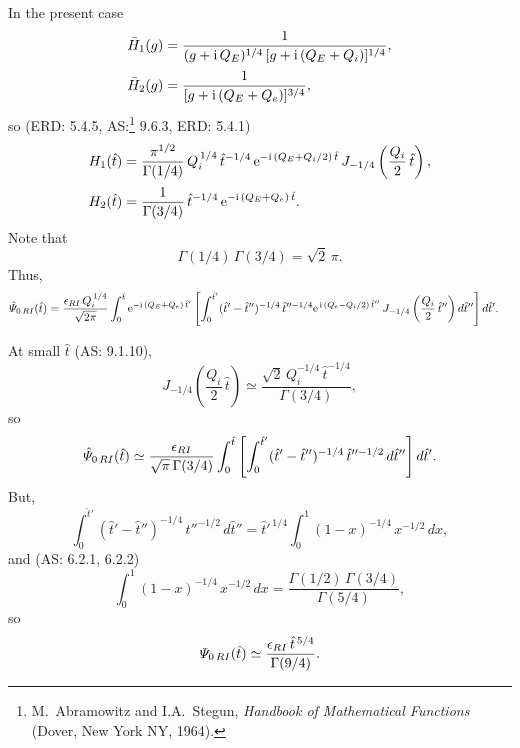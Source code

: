 \documentclass[titlepage=false,12pt]{article}
\begin{document}
In the present case
\begin{align}
\bar{H}_1(g) &= \frac{1}{(g+{\rm i}\,Q_E)^{1/4}\,[g+ {\rm i}\,(Q_E+Q_i)]^{1/4}},\\[0.5ex]
\bar{H}_2(g) &= \frac{1}{[g+{\rm i}\,(Q_E+Q_e)]^{3/4}},
\end{align}
so (ERD: 5.4.5, AS:\footnote{M.~Abramowitz and I.A.~Stegun, {\em Handbook of Mathematical Functions}\/ (Dover, New York NY, 1964).} 9.6.3, ERD: 5.4.1)
\begin{align}
H_1(\hat{t}) &= \frac{\pi^{1/2}}{\Gamma(1/4)}\,Q_i^{\,1/4}\,\hat{t}^{-1/4}\,{\rm e}^{-{\rm i}\,(Q_E+Q_i/2)\,\hat{t}}\,J_{-1/4}\left(\frac{Q_i}{2}\,\hat{t}\right),\\[0.5ex]
H_2(\hat{t})&= \frac{1}{\Gamma(3/4)}\,\hat{t}^{-1/4}\,{\rm e}^{-{\rm i}\,(Q_E+Q_e)\,\hat{t}}.
\end{align}
Note that
\begin{equation}
\Gamma(1/4)\,\Gamma(3/4) = \sqrt{2}\,\pi.
\end{equation}
Thus,
\begin{align}
\hat{\mit\Psi}_{0\,RI}(\hat{t}) &= \frac{\epsilon_{RI}\,Q_i^{\,1/4}}{\sqrt{2\pi}}\int_0^{\hat{t}}{\rm e}^{-{\rm i}\,(Q_E+Q_e)\,\hat{t}'}\left[
\int_0^{\hat{t}'}(\hat{t}'-\hat{t}'')^{-1/4}\,\hat{t}''^{-1/4}
{\rm e}^{\,{\rm i}\,(Q_e-Q_i/2)\,\hat{t}''}\,J_{-1/4}\left(\frac{Q_i}{2}\,\hat{t}''\right)d\hat{t}''\right]d\hat{t}'.
\end{align}

At small $\hat{t}$ (AS: 9.1.10), 
\begin{equation}
J_{-1/4}\left(\frac{Q_i}{2}\,\hat{t}\right)\simeq\frac{\sqrt{2}\,Q_i^{-1/4}\,\hat{t}^{-1/4}}{\Gamma(3/4)},
\end{equation}
so
\begin{equation}
\hat{\mit\Psi}_{0\,RI}(\hat{t})\simeq \frac{\epsilon_{RI}}{\sqrt{\pi}\,\Gamma(3/4)}
\int_0^{\hat{t}}\left[\int_0^{\hat{t}'}(\hat{t}'-\hat{t}'')^{-1/4}\,\hat{t}''^{-1/2}\,d\hat{t}''\right]d\hat{t}'.
\end{equation}
But,
\begin{equation}
\int_0^{\hat{t}'}(\hat{t}'-\hat{t}'')^{-1/4}\,\hat{t}''^{-1/2}\,d\hat{t}''=\hat{t}'^{\,1/4}\int_0^1(1-x)^{-1/4}\,x^{-1/2}\,dx,
\end{equation}
and (AS: 6.2.1, 6.2.2)
\begin{equation}
\int_0^1(1-x)^{-1/4}\,x^{-1/2}\,dx =\frac{\Gamma(1/2)\,\Gamma(3/4)}{\Gamma(5/4)},
\end{equation}
so
\begin{equation}
{\mit\Psi}_{0\,RI}(\hat{t})\simeq \frac{\epsilon_{RI}\,\hat{t}^{\,5/4}}{\Gamma(9/4)}.
\end{equation}
\end{document}
